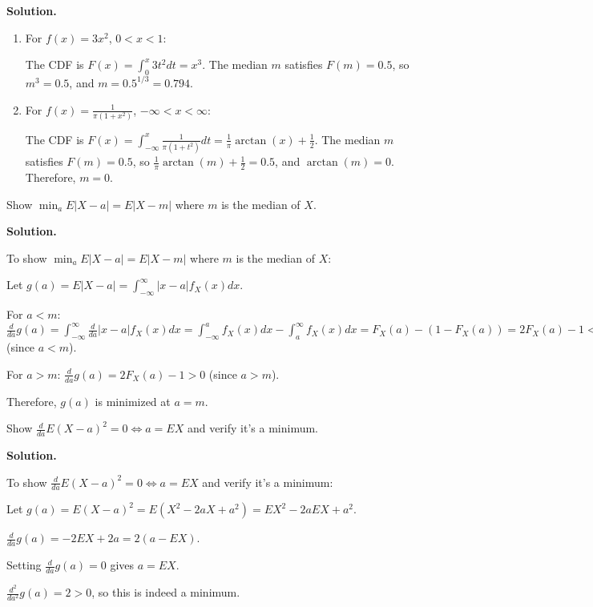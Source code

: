 \noindent\textbf{Solution.}
\begin{enumerate}[label=(\alph*)]
    \item For $f(x)=3x^2$, $0<x<1$:
    
    The CDF is $F(x) = \int_0^x 3t^2dt = x^3$.
    The median $m$ satisfies $F(m) = 0.5$, so $m^3 = 0.5$, and $m = 0.5^{1/3} = 0.794$.
    
    \item For $f(x)=\frac{1}{\pi(1+x^2)}$, $-\infty<x<\infty$:
    
    The CDF is $F(x) = \int_{-\infty}^x \frac{1}{\pi(1+t^2)}dt = \frac{1}{\pi}\arctan(x) + \frac{1}{2}$.
    The median $m$ satisfies $F(m) = 0.5$, so $\frac{1}{\pi}\arctan(m) + \frac{1}{2} = 0.5$, and $\arctan(m) = 0$.
    Therefore, $m = 0$.
\end{enumerate}

\begin{problembox}
Show $\min_a E|X-a| = E|X-m|$ where $m$ is the median of $X$.
\end{problembox}

\noindent\textbf{Solution.}

To show $\min_a E|X-a| = E|X-m|$ where $m$ is the median of $X$:

Let $g(a) = E|X-a| = \int_{-\infty}^{\infty} |x-a|f_X(x)dx$.

For $a < m$: $\frac{d}{da}g(a) = \int_{-\infty}^{\infty} \frac{d}{da}|x-a|f_X(x)dx = \int_{-\infty}^a f_X(x)dx - \int_a^{\infty} f_X(x)dx = F_X(a) - (1-F_X(a)) = 2F_X(a) - 1 < 0$ (since $a < m$).

For $a > m$: $\frac{d}{da}g(a) = 2F_X(a) - 1 > 0$ (since $a > m$).

Therefore, $g(a)$ is minimized at $a = m$.

\begin{problembox}
Show $\frac{d}{da}E(X-a)^2 = 0 \Leftrightarrow a=EX$ and verify it's a minimum.
\end{problembox}

\noindent\textbf{Solution.}

To show $\frac{d}{da}E(X-a)^2 = 0 \Leftrightarrow a=EX$ and verify it's a minimum:

Let $g(a) = E(X-a)^2 = E(X^2 - 2aX + a^2) = EX^2 - 2aEX + a^2$.

$\frac{d}{da}g(a) = -2EX + 2a = 2(a - EX)$.

Setting $\frac{d}{da}g(a) = 0$ gives $a = EX$.

$\frac{d^2}{da^2}g(a) = 2 > 0$, so this is indeed a minimum.

